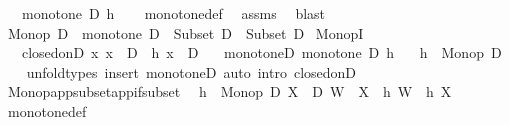 \begin{isabellebody}
\ \ \ {\isachardoublequoteopen}monotone\ D\ h{\isachardoublequoteclose}\isanewline
%
\isadelimproof
\ \ %
\endisadelimproof
%
\isatagproof
{}\isamarkupfalse%
\ monotone{\isacharunderscore}{\kern0pt}def\ \isamarkupfalse%
\ assms\ \isamarkupfalse%
\ blast%
\endisatagproof
{\isafoldproof}%
%
\isadelimproof
\isanewline
%
\endisadelimproof
\isanewline
{}\isamarkupfalse%
\ {\isachardoublequoteopen}Monop\ D\ {\isasymequiv}\ monotone\ D\ {\isasymsqdot}\ {\isacharparenleft}{\kern0pt}Subset\ D\ {\isasymRightarrow}\ Subset\ D{\isacharparenright}{\kern0pt}{\isachardoublequoteclose}\isanewline
\isanewline
{}\isamarkupfalse%
\ MonopI{\isacharcolon}{\kern0pt}\isanewline
\ \ \ closed{\isacharunderscore}{\kern0pt}on{\isacharunderscore}{\kern0pt}D{\isacharcolon}{\kern0pt}\ {\isachardoublequoteopen}{\isasymAnd}x{\isachardot}{\kern0pt}\ x\ {\isasymsubseteq}\ D\ {\isasymLongrightarrow}\ h\ x\ {\isasymsubseteq}\ D{\isachardoublequoteclose}\isanewline
\ \ \ monotone{\isacharunderscore}{\kern0pt}D{\isacharcolon}{\kern0pt}\ {\isachardoublequoteopen}monotone\ D\ h{\isachardoublequoteclose}\isanewline
\ \ \ {\isachardoublequoteopen}h\ {\isacharcolon}{\kern0pt}\ Monop\ D{\isachardoublequoteclose}\isanewline
%
\isadelimproof
\ \ %
\endisadelimproof
%
\isatagproof
{}\isamarkupfalse%
\ {\isacharparenleft}{\kern0pt}unfold{\isacharunderscore}{\kern0pt}types{\isacharparenright}{\kern0pt}\ {\isacharparenleft}{\kern0pt}insert\ monotone{\isacharunderscore}{\kern0pt}D{\isacharcomma}{\kern0pt}\ auto\ intro{\isacharbang}{\kern0pt}{\isacharcolon}{\kern0pt}\ closed{\isacharunderscore}{\kern0pt}on{\isacharunderscore}{\kern0pt}D{\isacharparenright}{\kern0pt}%
\endisatagproof
{\isafoldproof}%
%
\isadelimproof
\isanewline
%
\endisadelimproof
\isanewline
{}\isamarkupfalse%
\ Monop{\isacharunderscore}{\kern0pt}app{\isacharunderscore}{\kern0pt}subset{\isacharunderscore}{\kern0pt}app{\isacharunderscore}{\kern0pt}if{\isacharunderscore}{\kern0pt}subset{\isacharcolon}{\kern0pt}\isanewline
\ \ {\isachardoublequoteopen}{\isasymlbrakk}h\ {\isacharcolon}{\kern0pt}\ Monop\ D{\isacharsemicolon}{\kern0pt}\ X\ {\isasymsubseteq}\ D{\isacharsemicolon}{\kern0pt}\ W\ {\isasymsubseteq}\ X{\isasymrbrakk}\ {\isasymLongrightarrow}\ h\ W\ {\isasymsubseteq}\ h\ X{\isachardoublequoteclose}\isanewline
%
\isadelimproof
\ \ %
\endisadelimproof
%
\isatagproof
{}\isamarkupfalse%
\ monotone{\isacharunderscore}{\kern0pt}def\ \isamarkupfalse%

\end{isabellebody}

